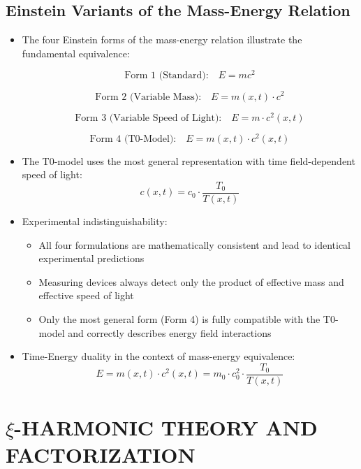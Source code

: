 \documentclass[12pt,a4paper]{article}
\begin{document}
	\subsection{Einstein Variants of the Mass-Energy Relation}
	\begin{itemize}
		\item The four Einstein forms of the mass-energy relation illustrate the fundamental equivalence:
		
		$$\text{Form 1 (Standard):} \quad \boxed{E = mc^2}$$
		
		$$\text{Form 2 (Variable Mass):} \quad \boxed{E = m(x,t) \cdot c^2}$$
		
		$$\text{Form 3 (Variable Speed of Light):} \quad \boxed{E = m \cdot c^2(x,t)}$$
		
		$$\text{Form 4 (T0-Model):} \quad \boxed{E = m(x,t) \cdot c^2(x,t)}$$
		
		\item The T0-model uses the most general representation with time field-dependent speed of light:
		$$c(x,t) = c_0 \cdot \frac{T_0}{T(x,t)}$$
		
		\item Experimental indistinguishability:
		\begin{itemize}
			\item All four formulations are mathematically consistent and lead to identical experimental predictions
			\item Measuring devices always detect only the product of effective mass and effective speed of light
			\item Only the most general form (Form 4) is fully compatible with the T0-model and correctly describes energy field interactions
		\end{itemize}
		
		\item Time-Energy duality in the context of mass-energy equivalence:
		$$E = m(x,t) \cdot c^2(x,t) = m_0 \cdot c_0^2 \cdot \frac{T_0}{T(x,t)}$$
	\end{itemize}
	
	\section{$\xi$-HARMONIC THEORY AND FACTORIZATION}
	
\end{document}
